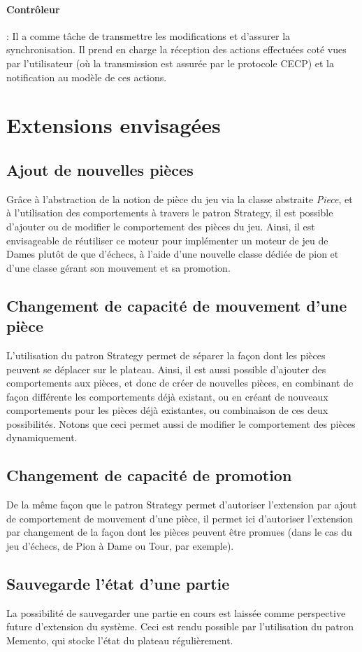 \documentclass[11pt]{article}
\begin{document}
\paragraph{Contrôleur} : Il a comme tâche de transmettre les modifications et d'assurer la synchronisation. Il prend en charge la réception des actions effectuées coté vues par l'utilisateur (où la transmission est assurée par le protocole CECP) et la notification au modèle de ces actions.
\newpage
\section{Extensions envisagées}
\label{sec-4}
\subsection{Ajout de nouvelles pièces}
\label{sec-4-1}
Grâce à l'abstraction de la notion de pièce du jeu via la classe abstraite \emph{Piece}, et à l'utilisation des comportements à travers le patron Strategy, il est possible d'ajouter ou de modifier le comportement des pièces du jeu. Ainsi, il est envisageable de réutiliser ce moteur pour implémenter un moteur de jeu de Dames plutôt de que d'échecs, à l'aide d'une nouvelle classe dédiée de pion et d'une classe gérant son mouvement et sa promotion.
\subsection{Changement de capacité de mouvement d'une pièce}
\label{sec-4-2}
L'utilisation du patron Strategy permet de séparer la façon dont les pièces peuvent se déplacer sur le plateau. Ainsi, il est aussi possible d'ajouter des comportements aux pièces, et donc de créer de nouvelles pièces, en combinant de façon différente les comportements déjà existant, ou en créant de nouveaux comportements pour les pièces déjà existantes, ou combinaison de ces deux possibilités. Notons que ceci permet aussi de modifier le comportement des pièces dynamiquement.
\subsection{Changement de capacité de promotion}
\label{sec-4-3}
De la même façon que le patron Strategy permet d'autoriser l'extension par ajout de comportement de mouvement d'une pièce, il permet ici d'autoriser l'extension par changement de la façon dont les pièces peuvent être promues (dans le cas du jeu d'échecs, de Pion à Dame ou Tour, par exemple).
\subsection{Sauvegarde l'état d'une partie}
\label{sec-4-4}
La possibilité de sauvegarder une partie en cours est laissée comme perspective future d'extension du système. Ceci est rendu possible par l'utilisation du patron Memento, qui stocke l'état du plateau régulièrement.
\end{document}
